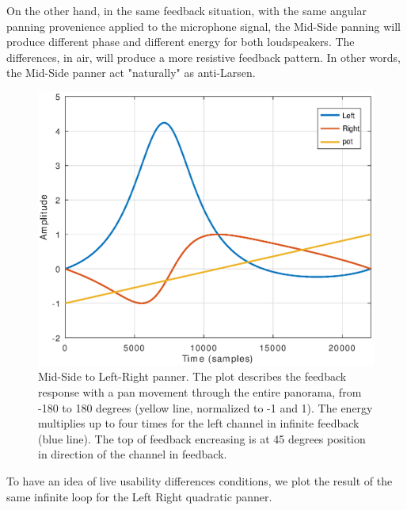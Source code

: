 \documentclass{article}
\begin{document}
On the other hand, in the same feedback situation, with the same angular panning provenience applied to the microphone signal, the Mid-Side panning will produce different phase and different energy for both loudspeakers. The differences, in air, will produce a more resistive feedback pattern. In other words, the Mid-Side panner act "naturally" as anti-Larsen.

\begin{figure}[h]
\centering
\includegraphics[width=1\columnwidth]{mspanlrfbpot}
\caption{Mid-Side to Left-Right panner. The plot describes the feedback response with a pan movement through the entire panorama, from -180 to 180 degrees (yellow line, normalized to -1 and 1). The energy multiplies up to four times for the left channel in infinite feedback (blue line). The top of feedback encreasing is at 45 degrees position in direction of the channel in feedback.}
\label{fig:mspanlrfb}
\end{figure}

To have an idea of live usability differences conditions, we plot the result of the same infinite loop for the Left Right quadratic panner. 
\end{document}
